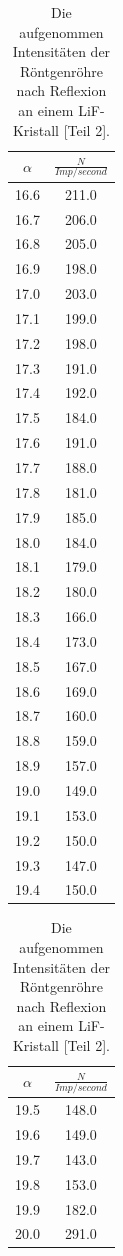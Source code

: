 \begin{table}
  \centering
  \caption{Die aufgenommen Intensitäten der Röntgenröhre nach Reflexion an einem LiF-Kristall [Teil 2].}
  \begin{tabular}[t]{cc}
  \toprule
  $\alpha$ & $\frac{N}{Imp/\si{second}}$ \\
  \midrule
  16.6 & 211.0  \\
  16.7 & 206.0  \\
  16.8 & 205.0  \\
  16.9 & 198.0  \\
  17.0 & 203.0  \\
  17.1 & 199.0  \\
  17.2 & 198.0  \\
  17.3 & 191.0  \\
  17.4 & 192.0  \\
  17.5 & 184.0  \\
  17.6 & 191.0  \\
  17.7 & 188.0  \\
  17.8 & 181.0  \\
  17.9 & 185.0  \\
  18.0 & 184.0  \\
  18.1 & 179.0  \\
  18.2 & 180.0  \\
  18.3 & 166.0  \\
  18.4 & 173.0  \\
  18.5 & 167.0  \\
  18.6 & 169.0  \\
  18.7 & 160.0  \\
  18.8 & 159.0  \\
  18.9 & 157.0  \\
  19.0 & 149.0  \\
  19.1 & 153.0  \\
  19.2 & 150.0  \\
  19.3 & 147.0  \\
  19.4 & 150.0\\
  \bottomrule
  \end{tabular}
  \begin{tabular}[t]{cc}
  \toprule
  $\alpha$ & $\frac{N}{Imp/\si{second}}$ \\
  \midrule
  19.5 & 148.0\\
  19.6 & 149.0\\
  19.7 & 143.0\\
  19.8 & 153.0\\
  19.9 & 182.0\\
  20.0 & 291.0\\

\end{tabular}
\end{table}
